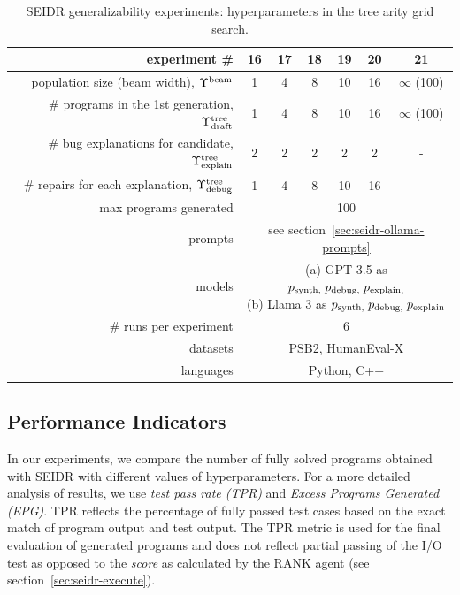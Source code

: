 \begin{table}
\setlength{\tabcolsep}{10pt}
\centering
\caption{SEIDR generalizability experiments: hyperparameters in the tree arity grid search.}\small
\label{tab:w-n-generalizability}
\begin{tabular}{rcccccc}
\toprule
experiment \# & 16 & 17 & 18 & 19 & 20 & 21\\
\midrule
population size (beam width), $\Upsilon^\text{beam}{}$ & 1 & 4 & 8 & 10 & 16 & $\infty$ (100) \\[4pt]
\# programs in the 1st generation, $\Upsilon^\text{tree}_\text{draft}$ & 1 & 4 & 8 & 10 & 16 & $\infty$ (100) \\[4pt]
\# bug explanations for candidate, $\Upsilon^\text{tree}_\text{explain}$ & 2 & 2 & 2 & 2 & 2 & - \\[4pt]
\# repairs for each explanation, $\Upsilon^\text{tree}_\text{debug}$ & 1 & 4 & 8 & 10 & 16 & - \\[4pt]
\midrule
max programs generated & \multicolumn{6}{c}{100} \\[4pt]
prompts & \multicolumn{6}{c}{see section~\ref{sec:seidr-ollama-prompts}} \\[4pt]
models  & \multicolumn{6}{c}{
 \parbox{5cm}{
     (a) GPT-3.5 as $p_\text{synth,} \; p_\text{debug,} \; p_\text{explain,}$ \\
     (b) Llama 3 as $p_\text{synth,} \; p_\text{debug,} \; p_\text{explain}$
     }
} \\[10pt]
\midrule
\# runs per experiment &  \multicolumn{6}{c}{6} \\[4pt]
datasets  & \multicolumn{6}{c}{PSB2, HumanEval-X} \\[4pt] 
languages  & \multicolumn{6}{c}{Python, C++} \\[4pt]
\bottomrule
\end{tabular}
\end{table}

\newpage\subsection{Performance Indicators}
\label{sec:seidr-metrics}

\sloppy %
In our experiments, we compare 
the number of fully solved programs obtained with SEIDR with different values of hyperparameters. 
For a more detailed analysis of results, we use \emph{test pass rate (TPR)} and \emph{Excess Programs Generated (EPG)}.
TPR reflects the percentage of fully passed test cases based on the exact match of program output and test output. 
The TPR metric is used for the final evaluation of generated programs and does not reflect partial passing of the I/O test as opposed to the \emph{score} as calculated by the RANK agent (see section~\ref{sec:seidr-execute}). 

